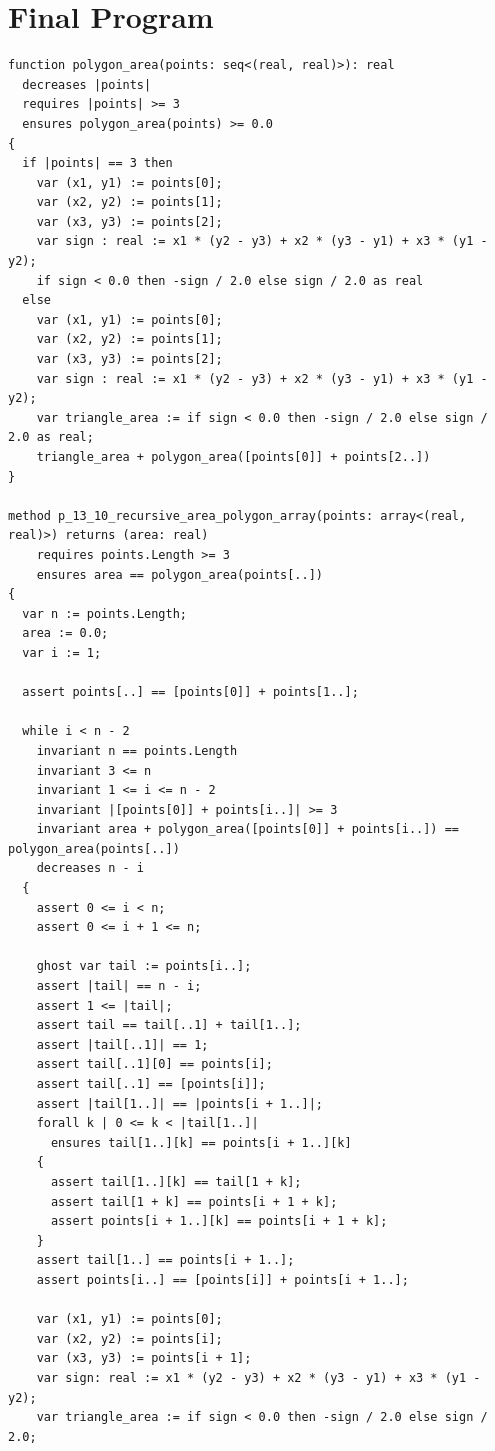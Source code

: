 \documentclass{article}
\begin{document}
\section*{Final Program}
\begin{lstlisting}
function polygon_area(points: seq<(real, real)>): real
  decreases |points|
  requires |points| >= 3
  ensures polygon_area(points) >= 0.0
{
  if |points| == 3 then 
    var (x1, y1) := points[0];
    var (x2, y2) := points[1];
    var (x3, y3) := points[2];
    var sign : real := x1 * (y2 - y3) + x2 * (y3 - y1) + x3 * (y1 - y2);
    if sign < 0.0 then -sign / 2.0 else sign / 2.0 as real 
  else 
    var (x1, y1) := points[0];
    var (x2, y2) := points[1];
    var (x3, y3) := points[2];
    var sign : real := x1 * (y2 - y3) + x2 * (y3 - y1) + x3 * (y1 - y2);
    var triangle_area := if sign < 0.0 then -sign / 2.0 else sign / 2.0 as real;
    triangle_area + polygon_area([points[0]] + points[2..])
}

method p_13_10_recursive_area_polygon_array(points: array<(real, real)>) returns (area: real)
	requires points.Length >= 3
	ensures area == polygon_area(points[..])
{
  var n := points.Length;
  area := 0.0;
  var i := 1;

  assert points[..] == [points[0]] + points[1..];

  while i < n - 2
    invariant n == points.Length
    invariant 3 <= n
    invariant 1 <= i <= n - 2
    invariant |[points[0]] + points[i..]| >= 3
    invariant area + polygon_area([points[0]] + points[i..]) == polygon_area(points[..])
    decreases n - i
  {
    assert 0 <= i < n;
    assert 0 <= i + 1 <= n;

    ghost var tail := points[i..];
    assert |tail| == n - i;
    assert 1 <= |tail|;
    assert tail == tail[..1] + tail[1..];
    assert |tail[..1]| == 1;
    assert tail[..1][0] == points[i];
    assert tail[..1] == [points[i]];
    assert |tail[1..]| == |points[i + 1..]|;
    forall k | 0 <= k < |tail[1..]|
      ensures tail[1..][k] == points[i + 1..][k]
    {
      assert tail[1..][k] == tail[1 + k];
      assert tail[1 + k] == points[i + 1 + k];
      assert points[i + 1..][k] == points[i + 1 + k];
    }
    assert tail[1..] == points[i + 1..];
    assert points[i..] == [points[i]] + points[i + 1..];

    var (x1, y1) := points[0];
    var (x2, y2) := points[i];
    var (x3, y3) := points[i + 1];
    var sign: real := x1 * (y2 - y3) + x2 * (y3 - y1) + x3 * (y1 - y2);
    var triangle_area := if sign < 0.0 then -sign / 2.0 else sign / 2.0;


\end{lstlisting}
\end{document}
